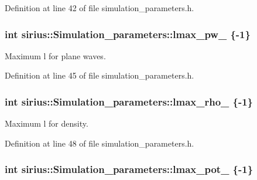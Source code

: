Definition at line 42 of file simulation\+\_\+parameters.\+h.

\hypertarget{classsirius_1_1_simulation__parameters_a71731a796167ac080a67f1c072b2eec5}{}
\subsubsection[{lmax\+\_\+pw\+\_\+}]{\setlength{\rightskip}{0pt plus 5cm}int sirius\+::\+Simulation\+\_\+parameters\+::lmax\+\_\+pw\+\_\+ \{-\/1\}\hspace{0.3cm}{\ttfamily [protected]}}\label{classsirius_1_1_simulation__parameters_a71731a796167ac080a67f1c072b2eec5}


Maximum l for plane waves. 



Definition at line 45 of file simulation\+\_\+parameters.\+h.

\hypertarget{classsirius_1_1_simulation__parameters_a019c88d01c1274ab1b9be0aa9c7633b6}{}
\subsubsection[{lmax\+\_\+rho\+\_\+}]{\setlength{\rightskip}{0pt plus 5cm}int sirius\+::\+Simulation\+\_\+parameters\+::lmax\+\_\+rho\+\_\+ \{-\/1\}\hspace{0.3cm}{\ttfamily [protected]}}\label{classsirius_1_1_simulation__parameters_a019c88d01c1274ab1b9be0aa9c7633b6}


Maximum l for density. 



Definition at line 48 of file simulation\+\_\+parameters.\+h.

\hypertarget{classsirius_1_1_simulation__parameters_a2e7fb99fcc65e7d37d9cc540136faa9c}{}
\subsubsection[{lmax\+\_\+pot\+\_\+}]{\setlength{\rightskip}{0pt plus 5cm}int sirius\+::\+Simulation\+\_\+parameters\+::lmax\+\_\+pot\+\_\+ \{-\/1\}\hspace{0.3cm}{\ttfamily [protected]}}\label{classsirius_1_1_simulation__parameters_a2e7fb99fcc65e7d37d9cc540136faa9c}


